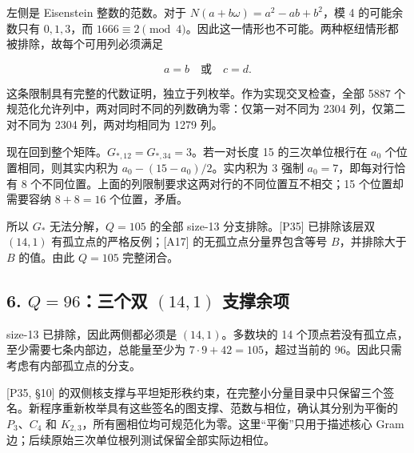 \documentclass[
  11pt,
  a4paper,
]{article}
\begin{document}
左侧是 Eisenstein 整数的范数。对于 \(N(a+b\omega)=a^2-ab+b^2\)，模 4
的可能余数只有 \(0,1,3\)，而
\(1666\equiv2\pmod4\)。因此这一情形也不可能。两种枢纽情形都被排除，故每个可用列必须满足

\[a=b\quad\text{或}\quad c=d.\]

这条限制具有完整的代数证明，独立于列枚举。作为实现交叉检查，全部 5887
个规范化允许列中，两对同时不同的列数确为零：仅第一对不同为 2304
列，仅第二对不同为 2304 列，两对均相同为 1279 列。

现在回到整个矩阵。\(G_{*,12}=G_{*,34}=3\)。若一对长度 15
的三次单位根行在 \(a_0\) 个位置相同，则其实内积为
\(a_0-(15-a_0)/2\)。实内积为 3 强制 \(a_0=7\)，即每对行恰有 8
个不同位置。上面的列限制要求这两对行的不同位置互不相交；15
个位置却需要容纳 \(8+8=16\) 个位置，矛盾。

所以 \(G_*\) 无法分解，\(Q=105\) 的全部 size-13 分支排除。{[}P35{]}
已排除该层双 \((14,1)\) 有孤立点的严格反例；{[}A17{]}
的无孤立点分量界包含等号 \(B\)，并排除大于 \(B\) 的值。由此 \(Q=105\)
完整闭合。

\subsection{\texorpdfstring{6. \(Q=96\)：三个双 \((14,1)\)
支撑余项}{6. Q=96：三个双 (14,1) 支撑余项}}\label{q96ux4e09ux4e2aux53cc-141-ux652fux6491ux4f59ux9879}

size-13 已排除，因此两侧都必须是 \((14,1)\)。多数块的 14
个顶点若没有孤立点，至少需要七条内部边，总能量至少为
\(7\cdot9+42=105\)，超过当前的 96。因此只需考虑有内部孤立点的分支。

{[}P35, §10{]}
的双侧核支撑与平坦矩形秩约束，在完整小分量目录中只保留三个签名。新程序重新枚举具有这些签名的图支撑、范数与相位，确认其分别为平衡的
\(P_3\)、\(C_4\) 和
\(K_{2,3}\)，所有圈相位均可规范化为零。这里``平衡''只用于描述核心 Gram
边；后续原始三次单位根列测试保留全部实际边相位。
\end{document}
